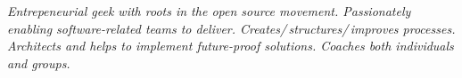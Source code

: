 \documentclass[10pt,a4paper]{article}
\begin{document}
\begin{multicols}{2}  %
\noindent \emph{Entrepeneurial geek with roots in the open source movement. Passionately enabling software-related teams to deliver. Creates/\,structures/\,improves processes. Architects and helps to implement future-proof solutions. Coaches both individuals and groups.}
\end{multicols}


\spacedhrule{0em}{-0.4em}

\end{document}
